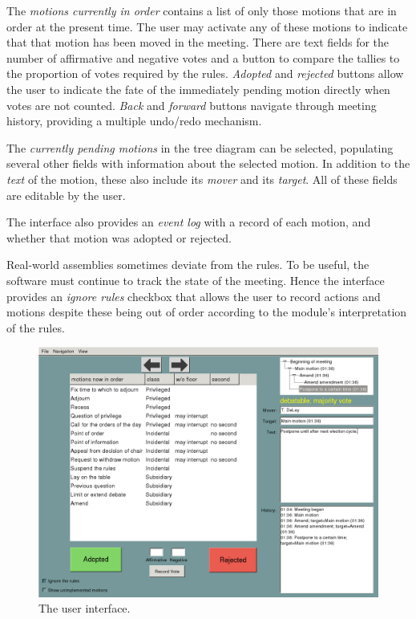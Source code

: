 \documentclass{book}
\begin{document}
The \emph{motions currently in order} contains a list of only those motions that are in order at the present time. The user may activate any of these motions to indicate that that motion has been moved in the meeting. There are text fields for the number of affirmative and negative votes and a button to compare the tallies to the proportion of votes required by the rules. \emph{Adopted} and \emph{rejected} buttons allow the user to indicate the fate of the immediately pending motion directly when votes are not counted. \emph{Back} and \emph{forward} buttons navigate through meeting history, providing a multiple undo/redo mechanism.

The \emph{currently pending motions} in the tree diagram can be selected, populating several other fields with information about the selected motion. In addition to the \emph{text} of the motion, these also include its \emph{mover} and its \emph{target}. All of these fields are editable by the user.

The interface also provides an \emph{event log} with a record of each motion, and whether that motion was adopted or rejected.

Real-world assemblies sometimes deviate from the rules. To be useful, the software must continue to track the state of the meeting. Hence the interface provides an \emph{ignore rules} checkbox that allows the user to record actions and motions despite these being out of order according to the module's interpretation of the rules.


\begin{figure}
\includegraphics[scale=.7]{user}
\caption{The user interface.}
\label{fig:user-interface}
\end{figure}
 
\end{document}
